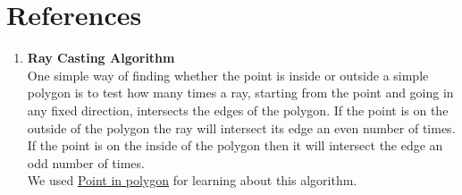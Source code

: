 \documentclass[12pt]{report}
\begin{document}
\newpage
\section*{References}
\begin{enumerate}
\item  \textbf{Ray Casting Algorithm} \\
One simple way of finding whether the point is inside or outside a simple polygon is to test how many times a ray, starting from the point and going in any fixed direction, intersects the edges of the polygon. If the point is on the outside of the polygon the ray will intersect its edge an even number of times. If the point is on the inside of the polygon then it will intersect the edge an odd number of times.\\
We used  \href{https://en.wikipedia.org/wiki/Point_in_polygon}{Point in polygon} for learning about this algorithm.
\end{enumerate}
\end{document}
